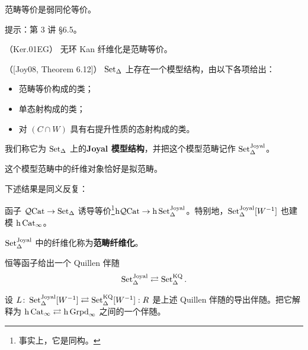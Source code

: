 \begin{exercise}\label{L5-4.8}
范畴等价是弱同伦等价。

提示：第 3 讲 \S6.5。
\end{exercise}

\begin{exercise}\label{L5-4.9}（Ker.01EG）
无环 Kan 纤维化是范畴等价。
\end{exercise}

\begin{theoremdef}\label{L5-4.10}（[Joy08, Theorem 6.12]）
$\operatorname{Set}_\Delta$ 上存在一个模型结构，由以下各项给出：
\begin{itemize}[leftmargin=2.2em,itemsep=0.1em,label={}]
\item[(W)] 范畴等价构成的类；
\item[(C)] 单态射构成的类；
\item[(F)] 对 $(C\cap W)$ 具有右提升性质的态射构成的类。
\end{itemize}
我们称它为 $\operatorname{Set}_\Delta$ 上的\textbf{Joyal 模型结构}，并把这个模型范畴记作 $\operatorname{Set}^{\mathrm{Joyal}}_\Delta$。

这个模型范畴中的纤维对象恰好是拟范畴。
\end{theoremdef}

\nitem\label{L5-4.11} 下述结果是同义反复：

\begin{exercise}\label{L5-4.12}
函子 $\mathcal{Q}\mathrm{Cat}\to\operatorname{Set}_\Delta$ 诱导等价\footnote{事实上，它是同构。}$\mathrm{h}\mathcal{Q}\mathrm{Cat}\to\mathrm{h}\operatorname{Set}^{\mathrm{Joyal}}_\Delta$。特别地，$\operatorname{Set}^{\mathrm{Joyal}}_\Delta[W^{-1}]$ 也建模 $\mathrm{h}\operatorname{Cat}_\infty$。
\end{exercise}

\begin{definition}\label{L5-4.13}
$\operatorname{Set}^{\mathrm{Joyal}}_\Delta$ 中的纤维化称为\textbf{范畴纤维化}。
\end{definition}

\begin{proposition}\label{L5-4.14}
恒等函子给出一个 Quillen 伴随
\[
\operatorname{Set}^{\mathrm{Joyal}}_\Delta\rightleftarrows\operatorname{Set}^{\mathrm{KQ}}_\Delta.
\]
\end{proposition}

\begin{exercise}\label{L5-4.15}
设 $L\colon\operatorname{Set}^{\mathrm{Joyal}}_\Delta[W^{-1}]\rightleftarrows\operatorname{Set}^{\mathrm{KQ}}_\Delta[W^{-1}]:R$ 是上述 Quillen 伴随的导出伴随。把它解释为 $\mathrm{h}\operatorname{Cat}_\infty\rightleftarrows\mathrm{h}\operatorname{Grpd}_\infty$ 之间的一个伴随。
\end{exercise}

